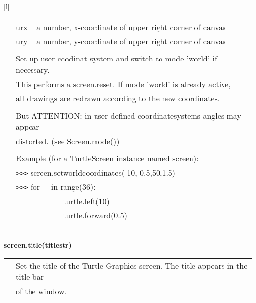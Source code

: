 \begin{center}
{\begin{tabular}{|l|}
\begin{tabular}{p{0.25in}p{4in}}
&        urx -- a number, x-coordinate of upper right corner of canvas \\
&        ury -- a number, y-coordinate of upper right corner of canvas \\
&  \\
&        Set up user coodinat-system and switch to mode 'world' if necessary. \\
&        This performs a screen.reset. If mode 'world' is already active, \\
&        all drawings are redrawn according to the new coordinates. \\
&  \\
&        But ATTENTION: in user-defined coordinatesystems angles may appear \\
&        distorted. (see Screen.mode()) \\
&  \\
&        Example (for a TurtleScreen instance named screen): \\
&        \verb+>+\verb+>+\verb+>+ screen.setworldcoordinates(-10,-0.5,50,1.5) \\
&        \verb+>+\verb+>+\verb+>+ for \_ in range(36): \\
&                ~~~~~~~~~~~~turtle.left(10) \\
&                ~~~~~~~~~~~~turtle.forward(0.5) \\ 
\end{tabular} \\ \hline
{\bf    screen.title(titlestr)} \\
   \begin{tabular}{p{0.25in}p{4in}}
& Set the title of the Turtle Graphics screen. The title appears in the title bar\\
& of the window. \\
\end{tabular} \\ \hline


\end{tabular}}
\end{center}
